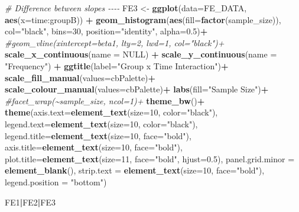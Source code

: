 \documentclass[
]{article}
\newenvironment{Shaded}{\begin{snugshade}}{\end{snugshade}}
\newcommand{\AttributeTok}[1]{\textcolor[rgb]{0.13,0.29,0.53}{#1}}
\newcommand{\CommentTok}[1]{\textcolor[rgb]{0.56,0.35,0.01}{\textit{#1}}}
\newcommand{\ConstantTok}[1]{\textcolor[rgb]{0.56,0.35,0.01}{#1}}
\newcommand{\DecValTok}[1]{\textcolor[rgb]{0.00,0.00,0.81}{#1}}
\newcommand{\FloatTok}[1]{\textcolor[rgb]{0.00,0.00,0.81}{#1}}
\newcommand{\FunctionTok}[1]{\textcolor[rgb]{0.13,0.29,0.53}{\textbf{#1}}}
\newcommand{\NormalTok}[1]{#1}
\newcommand{\OtherTok}[1]{\textcolor[rgb]{0.56,0.35,0.01}{#1}}
\newcommand{\SpecialCharTok}[1]{\textcolor[rgb]{0.81,0.36,0.00}{\textbf{#1}}}
\newcommand{\StringTok}[1]{\textcolor[rgb]{0.31,0.60,0.02}{#1}}
\begin{document}
\begin{Shaded}
\begin{Highlighting}[]
\CommentTok{\# Difference between slopes {-}{-}{-}{-}}
\NormalTok{FE3 }\OtherTok{\textless{}{-}} \FunctionTok{ggplot}\NormalTok{(}\AttributeTok{data=}\NormalTok{FE\_DATA, }\FunctionTok{aes}\NormalTok{(}\AttributeTok{x=}\StringTok{\textasciigrave{}}\AttributeTok{time:groupB}\StringTok{\textasciigrave{}}\NormalTok{)) }\SpecialCharTok{+}
  \FunctionTok{geom\_histogram}\NormalTok{(}\FunctionTok{aes}\NormalTok{(}\AttributeTok{fill=}\FunctionTok{factor}\NormalTok{(sample\_size)), }\AttributeTok{col=}\StringTok{"black"}\NormalTok{, }\AttributeTok{bins=}\DecValTok{30}\NormalTok{,}
                 \AttributeTok{position=}\StringTok{"identity"}\NormalTok{, }\AttributeTok{alpha=}\FloatTok{0.5}\NormalTok{)}\SpecialCharTok{+}
  \CommentTok{\#geom\_vline(xintercept=beta1, lty=2, lwd=1, col="black")+}
  \FunctionTok{scale\_x\_continuous}\NormalTok{(}\AttributeTok{name =} \ConstantTok{NULL}\NormalTok{) }\SpecialCharTok{+}
  \FunctionTok{scale\_y\_continuous}\NormalTok{(}\AttributeTok{name =} \StringTok{"Frequency"}\NormalTok{) }\SpecialCharTok{+}
  \FunctionTok{ggtitle}\NormalTok{(}\AttributeTok{label=}\StringTok{"Group x Time Interaction"}\NormalTok{)}\SpecialCharTok{+}
  \FunctionTok{scale\_fill\_manual}\NormalTok{(}\AttributeTok{values=}\NormalTok{cbPalette)}\SpecialCharTok{+}
  \FunctionTok{scale\_colour\_manual}\NormalTok{(}\AttributeTok{values=}\NormalTok{cbPalette)}\SpecialCharTok{+}
  \FunctionTok{labs}\NormalTok{(}\AttributeTok{fill=}\StringTok{"Sample Size"}\NormalTok{)}\SpecialCharTok{+}
  \CommentTok{\#facet\_wrap(\textasciitilde{}sample\_size, ncol=1)+}
  \FunctionTok{theme\_bw}\NormalTok{()}\SpecialCharTok{+}
  \FunctionTok{theme}\NormalTok{(}\AttributeTok{axis.text=}\FunctionTok{element\_text}\NormalTok{(}\AttributeTok{size=}\DecValTok{10}\NormalTok{, }\AttributeTok{color=}\StringTok{"black"}\NormalTok{),}
        \AttributeTok{legend.text=}\FunctionTok{element\_text}\NormalTok{(}\AttributeTok{size=}\DecValTok{10}\NormalTok{, }\AttributeTok{color=}\StringTok{"black"}\NormalTok{),}
        \AttributeTok{legend.title=}\FunctionTok{element\_text}\NormalTok{(}\AttributeTok{size=}\DecValTok{10}\NormalTok{, }\AttributeTok{face=}\StringTok{"bold"}\NormalTok{),}
        \AttributeTok{axis.title=}\FunctionTok{element\_text}\NormalTok{(}\AttributeTok{size=}\DecValTok{10}\NormalTok{, }\AttributeTok{face=}\StringTok{"bold"}\NormalTok{),}
        \AttributeTok{plot.title=}\FunctionTok{element\_text}\NormalTok{(}\AttributeTok{size=}\DecValTok{11}\NormalTok{, }\AttributeTok{face=}\StringTok{"bold"}\NormalTok{, }\AttributeTok{hjust=}\FloatTok{0.5}\NormalTok{),}
        \AttributeTok{panel.grid.minor =} \FunctionTok{element\_blank}\NormalTok{(),}
        \AttributeTok{strip.text =} \FunctionTok{element\_text}\NormalTok{(}\AttributeTok{size=}\DecValTok{10}\NormalTok{, }\AttributeTok{face=}\StringTok{"bold"}\NormalTok{),}
        \AttributeTok{legend.position =} \StringTok{"bottom"}\NormalTok{)}

\NormalTok{FE1}\SpecialCharTok{|}\NormalTok{FE2}\SpecialCharTok{|}\NormalTok{FE3}
\end{Highlighting}
\end{Shaded}
\end{document}
